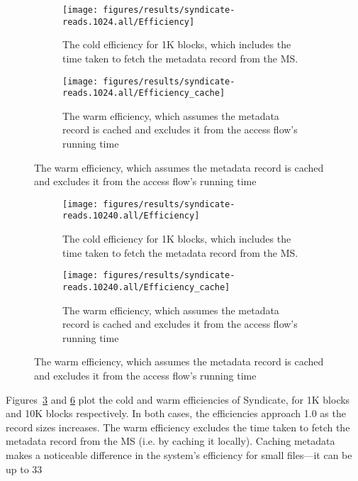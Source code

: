 \begin{figure}[htp!]
   \centering
   \caption{Box-and-wiskers plots of Syndicate's read efficiencies for 1K blocks.}
   \begin{subfigure}[b]{.8\textwidth}
      \texttt{[image: figures/results/syndicate-reads.1024.all/Efficiency]}
      \label{fig:syndicate-cold-efficiency-1k}
      \caption{The cold efficiency for 1K blocks, which includes the time taken to fetch the
      metadata record from the MS.}
   \end{subfigure}
   \begin{subfigure}[b]{.8\textwidth}
      \texttt{[image: figures/results/syndicate-reads.1024.all/Efficiency\_cache]}
      \label{fig:syndicate-warm-efficiency-1k}
      \caption{The warm efficiency, which assumes the metadata record is cached
      and excludes it from the access flow's running time}
   \end{subfigure}
   \label{fig:syndicate-read-efficiencies-1k}
\end{figure}

\begin{figure}[htp!]
   \centering
   \caption{Box-and-wiskers plots of Syndicate's read efficiencies for 10K blocks.}
   \begin{subfigure}[b]{.8\textwidth}
      \texttt{[image: figures/results/syndicate-reads.10240.all/Efficiency]}
      \label{fig:syndicate-cold-efficiency-10k}
      \caption{The cold efficiency for 1K blocks, which includes the time taken to fetch the
      metadata record from the MS.}
   \end{subfigure}
   \begin{subfigure}[b]{.8\textwidth}
      \texttt{[image: figures/results/syndicate-reads.10240.all/Efficiency\_cache]}
      \label{fig:syndicate-warm-efficiency-10k}
      \caption{The warm efficiency, which assumes the metadata record is cached
      and excludes it from the access flow's running time}
   \end{subfigure}
   \label{fig:syndicate-read-efficiencies-10k}
\end{figure}

Figures~\ref{fig:syndicate-read-efficiencies-1k} and
\ref{fig:syndicate-read-efficiencies-10k} plot the cold and warm efficiencies of
Syndicate, for 1K blocks and 10K blocks respectively.  In both cases, the
efficiencies approach 1.0 as the record sizes increases.  The warm efficiency
excludes the time taken to fetch the metadata record from the MS (i.e. by
caching it locally).  Caching metadata makes a noticeable difference in the
system's efficiency for small files---it can be up to 33%

